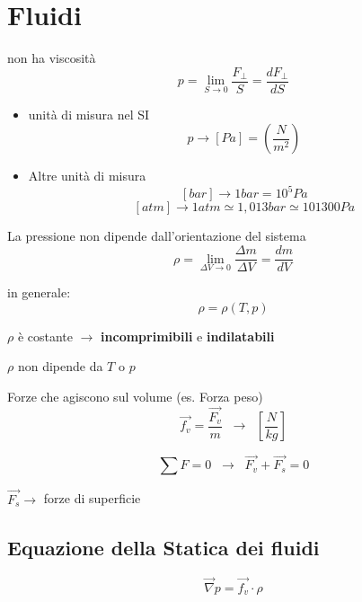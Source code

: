 \section{Fluidi}
 non ha viscosità
\vspace{\baselineskip}
    \begin{equation*}
        p = \lim_{S \to 0} \frac{F_\perp}{S} = \frac{dF_\perp}{dS}
    \end{equation*}
\begin{itemize}
    \item unità di misura nel SI
    \begin{equation*}
        p \to [Pa] = \left ( \frac{N}{m^2} \right )
    \end{equation*}
    
    \item Altre unità di misura
    \[
        [bar] \to 1 bar = 10^5 Pa 
    \]
    \[
        [atm] \to 1 atm \simeq 1,013 bar \simeq 101300 Pa
    \]
\end{itemize}

 La pressione non dipende dall'orientazione del sistema
\vspace{\baselineskip}
    \begin{equation*}
        \rho = \lim_{\Delta V \to 0} \frac{\Delta m}{\Delta V} = \frac{dm}{dV}
    \end{equation*}

\setlength\parindent{25pt} in generale:
    \begin{equation*}
        \rho = \rho(T, p)
    \end{equation*}
    
 $\rho$ è costante $\to$ \textbf{incomprimibili} e \textbf{indilatabili}

\setlength\parindent{90pt} $\rho$ non dipende da $T$ o $p$

 Forze che agiscono sul volume (es. Forza peso)
\[
\vec{f_v} = \frac{\vec{F_v}}{m} \;\; \to \;\; \left [ \frac{N}{kg} \right]
\]

\[
\sum F = 0 \;\; \to \;\; \vec{F_v} + \vec{F_s} = 0
\]

\begin{center}$\vec{F_s} \to$ forze di superficie \end{center}

\subsection{Equazione della Statica dei fluidi}
\begin{equation}
    \boxed{\vec{\nabla} p = \vec{f_v} \cdot \rho}
\end{equation}

